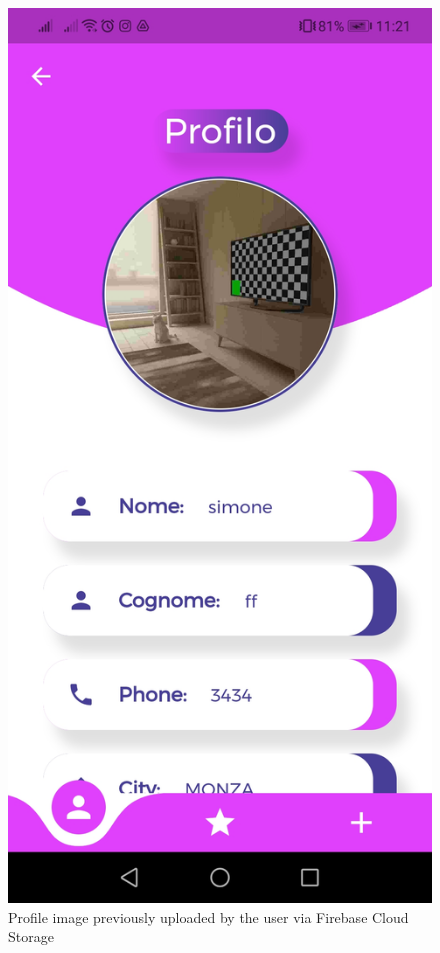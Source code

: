 \documentclass[../../dd.tex]{subfiles}
\begin{document}
    \begin{figure}[H]
        \centering
        \includegraphics[scale=0.2]{../../assets/fcs.jpg}
        \caption{Profile image previously uploaded by the user via Firebase Cloud Storage}\label{fig:widget-tests}
    \end{figure}
\end{document}
